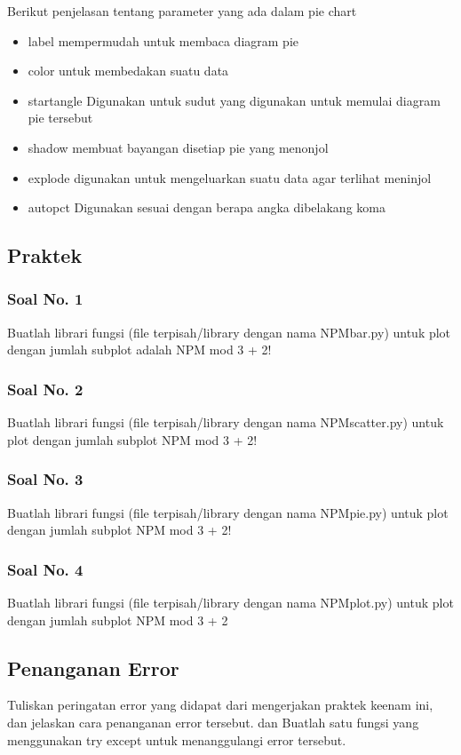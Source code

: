 \hfill \break
Berikut penjelasan tentang parameter yang ada dalam pie chart
\begin{itemize}
    \item label
	mempermudah untuk membaca diagram pie
    \item color
    untuk membedakan suatu data
    \item startangle
    Digunakan untuk sudut yang digunakan untuk memulai diagram pie tersebut
    \item shadow
    membuat bayangan disetiap pie yang menonjol
    \item explode
    digunakan untuk mengeluarkan suatu data agar terlihat meninjol
    \item autopct
    Digunakan sesuai dengan berapa angka dibelakang koma
\end{itemize}

\subsection{Praktek}
\subsubsection{Soal No. 1}
\hfill \break
Buatlah librari fungsi (file terpisah/library dengan nama NPMbar.py) untuk plot dengan jumlah subplot adalah NPM mod 3 + 2!

\subsubsection{Soal No. 2}
\hfill \break
Buatlah librari fungsi (file terpisah/library dengan nama NPMscatter.py) untuk plot dengan jumlah subplot NPM mod 3 + 2!

\subsubsection{Soal No. 3}
\hfill \break
Buatlah librari fungsi (file terpisah/library dengan nama NPMpie.py) untuk plot dengan jumlah subplot NPM mod 3 + 2!

\subsubsection{Soal No. 4}
\hfill \break
Buatlah librari fungsi (file terpisah/library dengan nama NPMplot.py) untuk plot dengan jumlah subplot NPM mod 3 + 2


\subsection{Penanganan Error}
Tuliskan  peringatan  error  yang  didapat  dari  mengerjakan  praktek  keenam  ini, dan  jelaskan  cara  penanganan  error  tersebut. dan  Buatlah  satu  fungsi  yang menggunakan try except untuk menanggulangi error tersebut.
